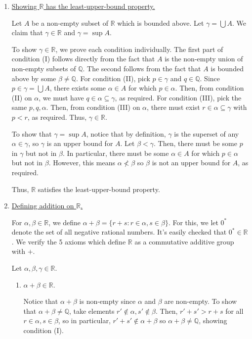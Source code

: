 \documentclass{scrbook}
\newcommand{\Q}{\mathbb{Q}}
\newcommand{\R}{\mathbb{R}}
\renewcommand{\underline}{\ul}
\begin{document}
\begin{enumerate}[Step 1.]
\item \underline{Showing $\R$ has the least-upper-bound property.}

Let $A$ be a non-empty subset of $\R$ which is bounded above. Let $\gamma = \bigcup A$. We claim that $\gamma \in \R$ and $\gamma = \sup A$. 

To show $\gamma \in \R$, we prove each condition individually. The first part of condition (I) follows directly from the fact that $A$ is the non-empty union of non-empty subsets of $\Q$. The second follows from the fact that $A$ is bounded above by some $\beta \ne \Q$. For condition (II), pick $p \in \gamma$ and $q \in \Q$. Since $p \in \gamma = \bigcup A$, there exists some $\alpha \in A$ for which $p \in \alpha$. Then, from condition (II) on $\alpha$, we must have $q \in \alpha \subseteq \gamma$, as required. For condition (III), pick the same $p, q, \alpha$. Then, from condition (III) on $\alpha$, there must exist $r \in \alpha \subseteq \gamma$ with $p < r$, as required. Thus, $\gamma \in \R$.

To show that $\gamma = \sup A$, notice that by definition, $\gamma$ is the superset of any $\alpha \in \gamma$, so $\gamma$ is an upper bound for $A$. Let $\beta < \gamma$. Then, there must be some $p$ in $ \gamma$ but not in $\beta$. In particular, there must be some $\alpha \in A$ for which $p \in \alpha$ but not in $\beta$. However, this means $\alpha \not< \beta$ so $\beta$ is not an upper bound for $A$, as required. 

Thus, $\R$ satisfies the least-upper-bound property.

\item \underline{Defining addition on $\R$.}

For $\alpha, \beta \in \R$, we define $\alpha + \beta = \{r + s : r \in \alpha, s \in \beta\}$. For this, we let $0^*$ denote the set of all negative rational numbers. It's easily checked that $0^* \in \R$. We verify the 5 axioms which define $\R$ as a commutative additive group with $+$.

Let $\alpha, \beta, \gamma \in \R$. 
\begin{enumerate}[({A}1)]
\item $\alpha + \beta \in \R$.

Notice that $\alpha + \beta$ is non-empty since $\alpha$ and $\beta$ are non-empty. To show that $\alpha + \beta \ne \Q$, take elements $r' \not\in \alpha, s' \not\in \beta$. Then, $r' + s' > r + s$ for all $r \in \alpha, s \in \beta$, so in particular, $r' + s' \not\in \alpha + \beta$ so $\alpha + \beta \ne \Q$, showing condition (I).


\end{enumerate}
\end{enumerate}
\end{document}
